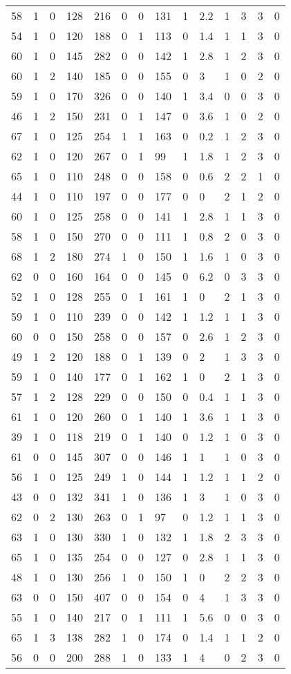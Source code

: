 \documentclass{article}
\begin{document}
\begin{longtable}{|l|l|l|l|l|l|l|l|l|l|l|l|l|l|}
58&1&0&128&216&0&0&131&1&2.2&1&3&3&0 \\ 
54&1&0&120&188&0&1&113&0&1.4&1&1&3&0 \\ 
60&1&0&145&282&0&0&142&1&2.8&1&2&3&0 \\ 
60&1&2&140&185&0&0&155&0&3&1&0&2&0 \\ 
59&1&0&170&326&0&0&140&1&3.4&0&0&3&0 \\ 
46&1&2&150&231&0&1&147&0&3.6&1&0&2&0 \\ 
67&1&0&125&254&1&1&163&0&0.2&1&2&3&0 \\ 
62&1&0&120&267&0&1&99&1&1.8&1&2&3&0 \\ 
65&1&0&110&248&0&0&158&0&0.6&2&2&1&0 \\ 
44&1&0&110&197&0&0&177&0&0&2&1&2&0 \\ 
60&1&0&125&258&0&0&141&1&2.8&1&1&3&0 \\ 
58&1&0&150&270&0&0&111&1&0.8&2&0&3&0 \\ 
68&1&2&180&274&1&0&150&1&1.6&1&0&3&0 \\ 
62&0&0&160&164&0&0&145&0&6.2&0&3&3&0 \\ 
52&1&0&128&255&0&1&161&1&0&2&1&3&0 \\ 
59&1&0&110&239&0&0&142&1&1.2&1&1&3&0 \\ 
60&0&0&150&258&0&0&157&0&2.6&1&2&3&0 \\ 
49&1&2&120&188&0&1&139&0&2&1&3&3&0 \\ 
59&1&0&140&177&0&1&162&1&0&2&1&3&0 \\ 
57&1&2&128&229&0&0&150&0&0.4&1&1&3&0 \\ 
61&1&0&120&260&0&1&140&1&3.6&1&1&3&0 \\ 
39&1&0&118&219&0&1&140&0&1.2&1&0&3&0 \\ 
61&0&0&145&307&0&0&146&1&1&1&0&3&0 \\ 
56&1&0&125&249&1&0&144&1&1.2&1&1&2&0 \\ 
43&0&0&132&341&1&0&136&1&3&1&0&3&0 \\ 
62&0&2&130&263&0&1&97&0&1.2&1&1&3&0 \\ 
63&1&0&130&330&1&0&132&1&1.8&2&3&3&0 \\ 
65&1&0&135&254&0&0&127&0&2.8&1&1&3&0 \\ 
48&1&0&130&256&1&0&150&1&0&2&2&3&0 \\ 
63&0&0&150&407&0&0&154&0&4&1&3&3&0 \\ 
55&1&0&140&217&0&1&111&1&5.6&0&0&3&0 \\ 
65&1&3&138&282&1&0&174&0&1.4&1&1&2&0 \\ 
56&0&0&200&288&1&0&133&1&4&0&2&3&0 \\ 

\end{longtable}
\end{document}
